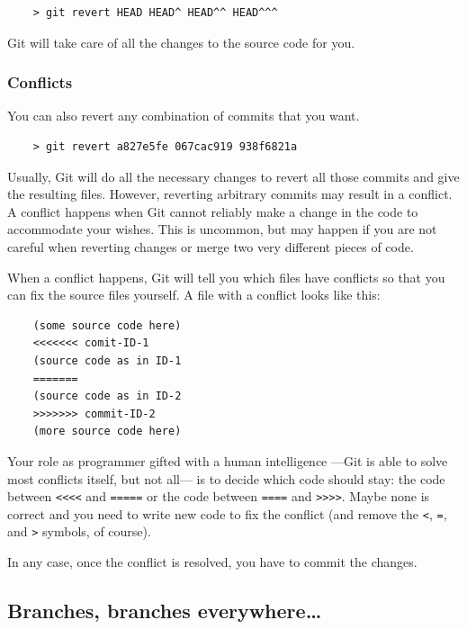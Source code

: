 \begin{verbatim}
    > git revert HEAD HEAD^ HEAD^^ HEAD^^^
\end{verbatim}

Git will take care of all the changes to the source code for you. 

\subsubsection{Conflicts}
\label{sec:conflicts}

You can also revert any combination of commits that you want. 

\begin{verbatim}
    > git revert a827e5fe 067cac919 938f6821a
\end{verbatim}

Usually, Git will do all the necessary changes to revert all those
commits and give the resulting files. 
However, reverting arbitrary commits
 may result in a conflict. A conflict happens when Git
cannot reliably make a change in the code to accommodate your
wishes. This is uncommon, but may happen if you are not careful when
reverting changes or merge two very different pieces of code. 

When a conflict happens, Git will tell you which files have conflicts
so that you can fix the source files yourself. A file with a conflict
looks like this: 

\begin{verbatim}
    (some source code here)
    <<<<<<< comit-ID-1
    (source code as in ID-1
    =======
    (source code as in ID-2
    >>>>>>> commit-ID-2
    (more source code here)
\end{verbatim}

Your role as programmer gifted with a human intelligence ---Git is
able to solve most conflicts itself, but not all--- is to decide
which code should stay: the code between \verb+<<<<+ and \verb+=====+
or the code between \verb+====+ and \verb+>>>>+. Maybe none is
correct and you need to write new code to fix the conflict (and remove
the \verb+<+, \verb+=+, and \verb+>+ symbols, of course). 

In any case, once the conflict is resolved, you have to commit the
changes. 


\subsection{Branches, branches everywhere\ldots}
\label{sec:branch-branch-everyw}

